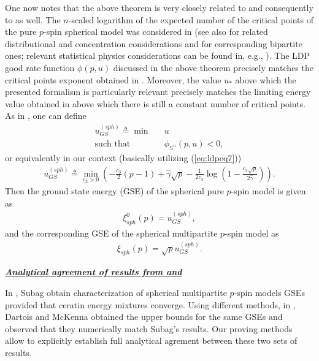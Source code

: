 \documentclass[10pt]{article}
\def\mS{{\mathbb S}}
\def\lp{\left (}
\def\rp{\right )}
\begin{document}
One now notes that the above theorem is very closely related to  \cite{Auff13} and consequently to \cite{Auff13a,Subag17,Subag17a} as well. The $n$-scaled logarithm of the expected number of the critical points of the pure $p$-spin spherical model was considered in  \cite{Auff13} (see also \cite{SubZeit17,SubZeit21} for related distributional and concentration considerations and \cite{McKenna24,Genovese22,AuffChen14,Kivimae23} for corresponding bipartite ones; relevant statistical physics considerations can be found in, e.g., \cite{Fyod04}).  The LDP good rate function $\phi(p,u)$ discussed in the above theorem precisely matches the critical points exponent obtained in \cite{Auff13}. Moreover, the value $u_*$ above which the presented formalism is particularly relevant precisely matches the limiting energy value obtained in \cite{Auff13} above which there is still a constant number of critical points. As in \cite{Auff13}, one can define
 \begin{eqnarray}
 \label{eq:ldpeq18}
u^{(sph)}_{GS}   \triangleq
\min & &  u \nonumber \\
\mbox{such that} & & \phi_{\mS^n}(p,u) <0,
  \end{eqnarray}
  or equivalently in our context (basically utilizing (\ref{eq:ldpeq7}))
 \begin{eqnarray}
 \label{eq:ldpeq18a}
u^{(sph)}_{GS}   \triangleq
\min_{c_3>0} \lp -\frac{c_{3}}{2}(p-1)  +  \hat{ \gamma } \sqrt{p} -\frac{1}{2c_3} \log\lp 1- \frac{c_3\sqrt{p}}{2\hat{\gamma}}\rp \rp.
    \end{eqnarray}
Then the ground state energy (GSE) of the spherical pure $p$-spin model is given as
 \begin{eqnarray}
 \label{eq:ldpeq18a}
\xi^0_{sph}(p) = u^{(sph)}_{GS},
   \end{eqnarray}
   and  the corresponding GSE of the spherical multipartite $p$-spin model as
 \begin{eqnarray}
 \label{eq:ldpeq19}
\xi_{sph}(p) = \sqrt{p}u^{(sph)}_{GS}.
   \end{eqnarray}




\vspace{.2in}

\noindent \underline{\emph{\textbf{Analytical agreement of results from \cite{Subagtap23b} and \cite{DarMc24}}}}

In \cite{Subagtap23b}, Subag obtain characterization of spherical multipartite $p$-spin models GSEs provided that ceratin energy mixtures converge. Using different methods, in \cite{DarMc24}, Dartois and McKenna obtained the upper bounds for the same GSEs and observed that they numerically match Subag's results. Our proving methods allow to explicitly establish full analytical agrement between these two sets of results.
\end{document}

